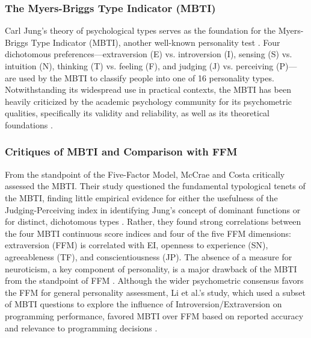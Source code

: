 \documentclass{DESSThesis}
\begin{document}
\subsubsection{The Myers-Briggs Type Indicator (MBTI)}
Carl Jung's theory of psychological types serves as the foundation for the Myers-Briggs Type Indicator (MBTI), another well-known personality test \cite{mccrae_reinterpreting_1989,li_influence_2018}. Four dichotomous preferences—extraversion (E) vs. introversion (I), sensing (S) vs. intuition (N), thinking (T) vs. feeling (F), and judging (J) vs. perceiving (P)—are used by the MBTI to classify people into one of 16 personality types. Notwithstanding its widespread use in practical contexts, the MBTI has been heavily criticized by the academic psychology community for its psychometric qualities, specifically its validity and reliability, as well as its theoretical foundations \cite{mccrae_reinterpreting_1989}.

\subsubsection{Critiques of MBTI and Comparison with FFM}
From the standpoint of the Five-Factor Model, McCrae and Costa critically assessed the MBTI. Their study questioned the fundamental typological tenets of the MBTI, finding little empirical evidence for either the usefulness of the Judging-Perceiving index in identifying Jung's concept of dominant functions or for distinct, dichotomous types \cite{mccrae_reinterpreting_1989}. Rather, they found strong correlations between the four MBTI continuous score indices and four of the five FFM dimensions: extraversion (FFM) is correlated with EI, openness to experience (SN), agreeableness (TF), and conscientiousness (JP). The absence of a measure for neuroticism, a key component of personality, is a major drawback of the MBTI from the standpoint of FFM \cite{mccrae_reinterpreting_1989}. Although the wider psychometric consensus favors the FFM for general personality assessment, Li et al.'s study, which used a subset of MBTI questions to explore the influence of Introversion/Extraversion on programming performance, favored MBTI over FFM based on reported accuracy and relevance to programming decisions \cite{li_influence_2018}.
\end{document}
